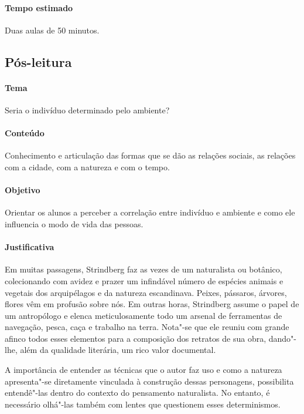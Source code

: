 \documentclass[12pt]{extarticle}
\begin{document}
\paragraph{Tempo estimado} Duas aulas de 50 minutos.

\subsection{Pós-leitura}


\paragraph{Tema} Seria o indivíduo determinado pelo ambiente? 

\paragraph{Conteúdo} Conhecimento e articulação das formas que se dão as relações sociais, as
relações com a cidade, com a natureza e com o tempo.

\paragraph{Objetivo} Orientar os alunos a perceber a 
correlação entre indivíduo e ambiente e como ele influencia o modo de vida das pessoas.

\paragraph{Justificativa} Em muitas passagens, Strindberg
faz as vezes de um naturalista ou botânico, colecionando
com avidez e prazer um infindável número de espécies
animais e vegetais dos arquipélagos e da natureza escandinava.
Peixes, pássaros, árvores, flores vêm em profusão
sobre nós. Em outras horas, Strindberg assume o papel
de um antropólogo e elenca meticulosamente todo um arsenal
de ferramentas de navegação, pesca, caça e trabalho na
terra. Nota"-se que ele reuniu com grande afinco todos esses
elementos para a composição dos retratos de sua obra, dando"-lhe,
além da qualidade literária, um rico valor documental.

A importância de entender as técnicas que o autor faz uso e como a natureza 
apresenta"-se diretamente vinculada à construção dessas personagens, possibilita 
entendê"-las dentro do contexto do pensamento naturalista. No entanto, é necessário 
olhá"-las também com lentes que questionem esses determinismos.
\end{document}
